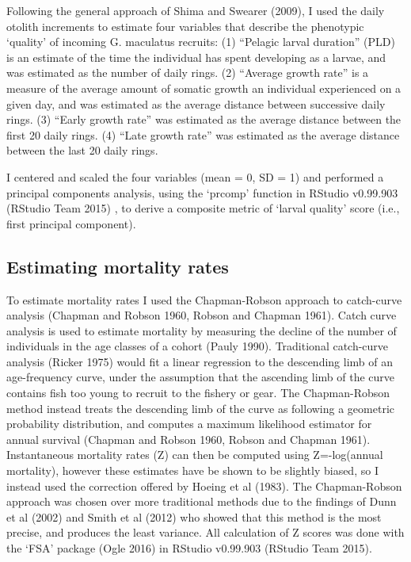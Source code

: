\documentclass[]{book}
\begin{document}
Following the general approach of Shima and Swearer (2009), I used the
daily otolith increments to estimate four variables that describe the
phenotypic `quality' of incoming G. maculatus recruits: (1) ``Pelagic
larval duration'' (PLD) is an estimate of the time the individual has
spent developing as a larvae, and was estimated as the number of daily
rings. (2) ``Average growth rate'' is a measure of the average amount of
somatic growth an individual experienced on a given day, and was
estimated as the average distance between successive daily rings. (3)
``Early growth rate'' was estimated as the average distance between the
first 20 daily rings. (4) ``Late growth rate'' was estimated as the
average distance between the last 20 daily rings.

I centered and scaled the four variables (mean = 0, SD = 1) and
performed a principal components analysis, using the `prcomp' function
in RStudio v0.99.903 (RStudio Team 2015) , to derive a composite metric
of `larval quality' score (i.e., first principal component).

\subsection{Estimating mortality
rates}\label{estimating-mortality-rates}

To estimate mortality rates I used the Chapman-Robson approach to
catch-curve analysis (Chapman and Robson 1960, Robson and Chapman 1961).
Catch curve analysis is used to estimate mortality by measuring the
decline of the number of individuals in the age classes of a cohort
(Pauly 1990). Traditional catch-curve analysis (Ricker 1975) would fit a
linear regression to the descending limb of an age-frequency curve,
under the assumption that the ascending limb of the curve contains fish
too young to recruit to the fishery or gear. The Chapman-Robson method
instead treats the descending limb of the curve as following a geometric
probability distribution, and computes a maximum likelihood estimator
for annual survival (Chapman and Robson 1960, Robson and Chapman 1961).
Instantaneous mortality rates (Z) can then be computed using
Z=-log(annual mortality), however these estimates have be shown to be
slightly biased, so I instead used the correction offered by Hoeing et
al (1983). The Chapman-Robson approach was chosen over more traditional
methods due to the findings of Dunn et al (2002) and Smith et al (2012)
who showed that this method is the most precise, and produces the least
variance. All calculation of Z scores was done with the `FSA' package
(Ogle 2016) in RStudio v0.99.903 (RStudio Team 2015).
\end{document}

